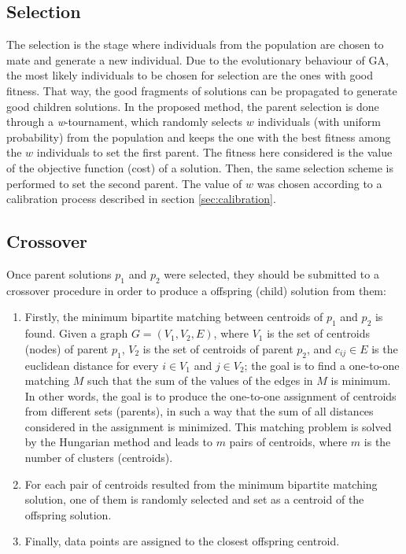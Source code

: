\subsection{Selection}
\label{subsec:selection}
The selection is the stage where individuals from the population are chosen to mate and generate a new individual. Due to the evolutionary behaviour of GA, the most likely individuals to be chosen for selection are the ones with good fitness. That way, the good fragments of solutions can be propagated to generate good children solutions. In the proposed method, the parent selection is done through a \textit{w}-tournament, which randomly selects $w$ individuals (with uniform probability) from the population and keeps the one with the best fitness among the $w$ individuals to set the first parent. The fitness here considered is the value of the objective function (cost) of a solution. Then, the same selection scheme is performed to set the second parent. The value of $w$ was chosen according to a calibration process described in section \ref{sec:calibration}.

\subsection{Crossover}
\label{subsec:crossover}
Once parent solutions $p_1$ and $p_2$ were selected, they should be submitted to a crossover procedure in order to produce a offspring (child) solution from them:

\begin{enumerate}
	\item Firstly, the minimum bipartite matching between centroids of $p_1$ and $p_2$ is found. Given a graph $G = (V_1, V_2, E)$, where $V_1$ is the set of centroids (nodes) of parent $p_1$, $V_2$ is the set of centroids of parent $p_2$, and $c_{ij} \in E$ is the euclidean distance for every $i \in V_1$ and $j \in V_2$; the goal is to find a one-to-one matching $M$ such that the sum of the values of the edges in $M$ is minimum. In other words, the goal is to produce the one-to-one assignment of centroids from different sets (parents), in such a way that the sum of all distances considered in the assignment is minimized. This matching problem is solved by the Hungarian method \cite{Kuhn1955} and leads to $m$ pairs of centroids, where $m$ is the number of clusters (centroids).

	\item For each pair of centroids resulted from the minimum bipartite matching solution, one of them is randomly selected and set as a centroid of the offspring solution.

	\item Finally, data points are assigned to the closest offspring centroid.
\end{enumerate}


